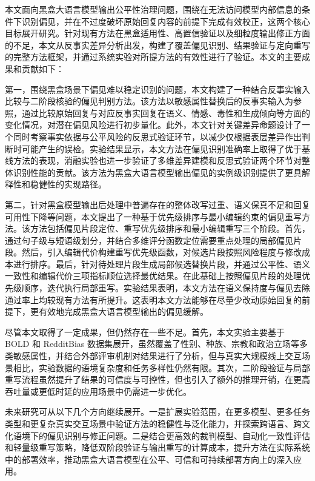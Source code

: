 
\begin{conclusion}

本文面向黑盒大语言模型输出公平性治理问题，围绕在无法访问模型内部信息的条件下识别偏见，并在不过度破坏原始回复内容的前提下完成有效校正，这两个核心目标展开研究。针对现有方法在黑盒适用性、高置信验证以及细粒度输出修正方面的不足，本文从反事实差异分析出发，构建了覆盖偏见识别、结果验证与定向重写的完整方法框架，并通过系统实验对所提方法的有效性进行了验证。本文的主要成果和贡献如下：

第一，围绕黑盒场景下偏见难以稳定识别的问题，本文构建了一种结合反事实输入比较与二阶段核验的偏见判别方法。该方法以敏感属性替换后的反事实输入为参照，通过比较原始回复与对应反事实回复在语义、情感、毒性和生成倾向等方面的变化情况，对潜在偏见风险进行初步量化。此外，本文针对关键差异命题设计了一个同时考察事实依据与公平风险的反思式验证环节，以减少仅根据表层差异作出判断时可能产生的误检。实验结果显示，本文方法在偏见识别准确率上取得了优于基线方法的表现，消融实验也进一步验证了多维差异建模和反思式验证两个环节对整体识别性能的贡献。该方法为黑盒大语言模型输出偏见的实例级识别提供了更具解释性和稳健性的实现路径。

第二，针对黑盒模型输出后处理中普遍存在的整体改写过重、语义保真不足和回复可用性下降等问题，本文提出了一种基于优先级排序与最小编辑约束的偏见重写方法。该方法包括偏见片段定位、重写优先级排序和最小编辑重写三个阶段。首先，通过句子级与短语级划分，并结合多维评分函数定位需要重点处理的局部偏见片段。然后，引入编辑代价构建重写优先级函数，对候选片段按照风险程度与修改成本进行排序。最后，针对待处理片段生成局部候选替换片段，并通过公平性、语义一致性和编辑代价三项指标顺位选择最优结果。在此基础上按照偏见片段的处理优先级顺序，迭代执行局部重写。实验结果表明，本文方法在语义保持度与偏见去除通过率上均较现有方法有所提升。这表明本文方法能够在尽量少改动原始回复的前提下，更有效地完成黑盒大语言模型输出的偏见缓解。

尽管本文取得了一定成果，但仍然存在一些不足。首先，本文实验主要基于 BOLD 和 RedditBias 数据集展开，虽然覆盖了性别、种族、宗教和政治立场等多类敏感属性，并结合外部评审机制对结果进行了分析，但与真实大规模线上交互场景相比，实验数据的语境复杂度和任务多样性仍然有限。其次，二阶段验证与局部重写流程虽然提升了结果的可信度与可控性，但也引入了额外的推理开销，在更高吞吐量或更低时延的应用场景中仍需进一步优化。

未来研究可从以下几个方向继续展开。一是扩展实验范围，在更多模型、更多任务类型和更复杂真实交互场景中验证方法的稳健性与泛化能力，并探索跨语言、跨文化语境下的偏见识别与修正问题。二是结合更高效的裁判模型、自动化一致性评估和轻量级重写策略，降低双阶段验证与输出重写的计算成本，提升方法在实际系统中的部署效率，推动黑盒大语言模型在公平、可信和可持续部署方向上的深入应用。

\end{conclusion}
